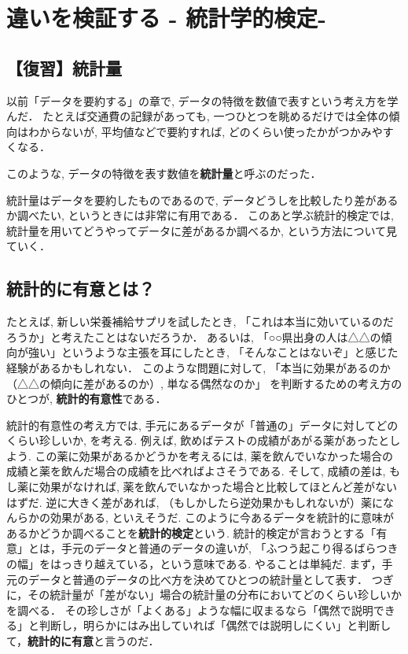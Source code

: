 \section{違いを検証する - 統計学的検定- }
  \subsection{【復習】統計量}
    以前「データを要約する」の章で, データの特徴を数値で表すという考え方を学んだ．
    たとえば交通費の記録があっても, 一つひとつを眺めるだけでは全体の傾向はわからないが,
    平均値などで要約すれば, どのくらい使ったかがつかみやすくなる．
    
    このような, データの特徴を表す数値を\textbf{統計量}と呼ぶのだった．

    統計量はデータを要約したものであるので, データどうしを比較したり差があるか調べたい, というときには非常に有用である．
    このあと学ぶ統計的検定では, 統計量を用いてどうやってデータに差があるか調べるか, という方法について見ていく．

  \subsection{統計的に有意とは？}

    たとえば, 新しい栄養補給サプリを試したとき,
    「これは本当に効いているのだろうか」と考えたことはないだろうか．
    あるいは, 「○○県出身の人は△△の傾向が強い」というような主張を耳にしたとき,
    「そんなことはないぞ」と感じた経験があるかもしれない．
    このような問題に対して,
    「本当に効果があるのか（△△の傾向に差があるのか）, 単なる偶然なのか」
    を判断するための考え方のひとつが,
    \textbf{統計的有意性}である．
    
    統計的有意性の考え方では, 手元にあるデータが「普通の」データに対してどのくらい珍しいか, を考える.
    例えば, 飲めばテストの成績があがる薬があったとしよう.
    この薬に効果があるかどうかを考えるには, 薬を飲んでいなかった場合の成績と薬を飲んだ場合の成績を比べればよさそうである.
    そして, 成績の差は, もし薬に効果がなければ, 薬を飲んでいなかった場合と比較してほとんど差がないはずだ.
    逆に大きく差があれば, （もしかしたら逆効果かもしれないが）薬になんらかの効果がある, といえそうだ.
    このように今あるデータを統計的に意味があるかどうか調べることを\textbf{統計的検定}という.
    統計的検定が言おうとする「有意」とは，手元のデータと普通のデータの違いが, 「ふつう起こり得るばらつきの幅」をはっきり越えている，という意味である.
    やることは単純だ.
    まず，手元のデータと普通のデータの比べ方を決めてひとつの統計量として表す．
    つぎに，その統計量が「差がない」場合の統計量の分布においてどのくらい珍しいかを調べる．
    その珍しさが「よくある」ような幅に収まるなら「偶然で説明できる」と判断し，明らかにはみ出していれば「偶然では説明しにくい」と判断して，\textbf{統計的に有意}と言うのだ．

